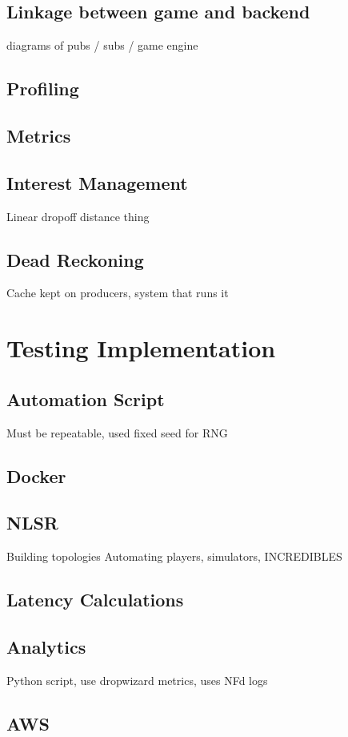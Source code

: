 \subsection{Linkage between game and backend}
diagrams of pubs / subs / game engine


\subsection{Profiling}

\subsection{Metrics}

\subsection*{Interest Management}\label{sec:impl:im}
Linear dropoff distance thing

\subsection*{Dead Reckoning}\label{sec:des:dr}
Cache kept on producers, system that runs it

\section{Testing Implementation}
\subsection{Automation Script}
Must be repeatable, used fixed seed for RNG

\subsection{Docker}


\subsection{NLSR}
Building topologies
Automating players, simulators, INCREDIBLES


\subsection{Latency Calculations}


\subsection{Analytics}
Python script, use dropwizard metrics, uses NFd logs


\subsection{AWS}


